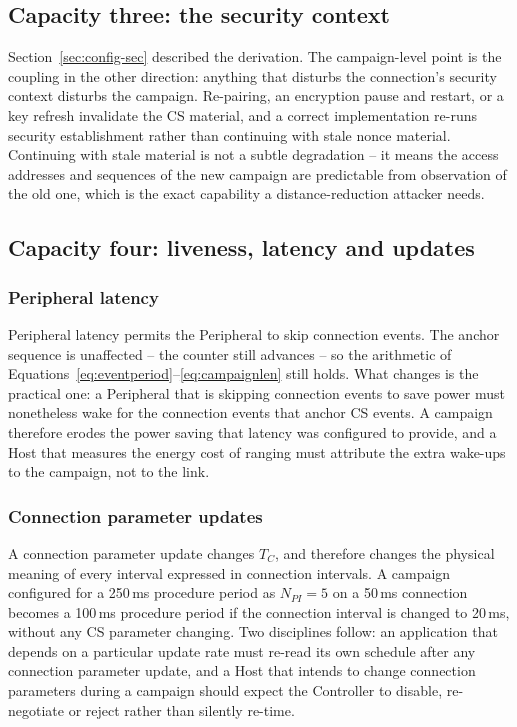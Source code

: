 \documentclass[11pt,a4paper]{article}
\newcommand{\Tconn}{T_{C}}
\newcommand{\Npi}{N_{PI}}
\begin{document}
\subsection{Capacity three: the security context}

Section~\ref{sec:config-sec} described the derivation. The campaign-level point is the coupling in the
other direction: anything that disturbs the connection's security context disturbs the campaign.
Re-pairing, an encryption pause and restart, or a key refresh invalidate the CS material, and a
correct implementation re-runs security establishment rather than continuing with stale nonce
material. Continuing with stale material is not a subtle degradation -- it means the access addresses
and sequences of the new campaign are predictable from observation of the old one, which is the exact
capability a distance-reduction attacker needs.

\subsection{Capacity four: liveness, latency and updates}
\label{sec:acl-updates}

\subsubsection{Peripheral latency}

Peripheral latency permits the Peripheral to skip connection events. The anchor sequence is
unaffected -- the counter still advances -- so the arithmetic of
Equations~\eqref{eq:eventperiod}--\eqref{eq:campaignlen} still holds. What changes is the practical
one: a Peripheral that is skipping connection events to save power must nonetheless wake for the
connection events that anchor CS events. A campaign therefore erodes the power saving that latency
was configured to provide, and a Host that measures the energy cost of ranging must attribute the
extra wake-ups to the campaign, not to the link.

\subsubsection{Connection parameter updates}

A connection parameter update changes $\Tconn$, and therefore changes the physical meaning of every
interval expressed in connection intervals. A campaign configured for a 250\,ms procedure period as
$\Npi = 5$ on a 50\,ms connection becomes a 100\,ms procedure period if the connection interval is
changed to 20\,ms, without any CS parameter changing. Two disciplines follow: an application that
depends on a particular update rate must re-read its own schedule after any connection parameter
update, and a Host that intends to change connection parameters during a campaign should expect the
Controller to disable, re-negotiate or reject rather than silently re-time.
\end{document}
